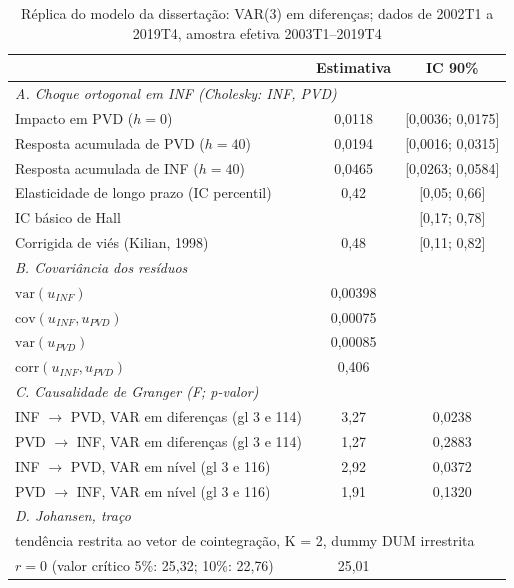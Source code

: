 \begin{table}[htbp]
\centering
\caption{R\'eplica do modelo da disserta\c{c}\~ao: VAR(3) em diferen\c{c}as; dados de 2002T1 a 2019T4, amostra efetiva 2003T1--2019T4}
\label{tab:a1_baseline}
\small
\begin{tabular}{lcc}
\toprule
 & Estimativa & IC 90\% \\
\midrule
\multicolumn{3}{l}{\textit{A. Choque ortogonal em INF (Cholesky: INF, PVD)}} \\
Impacto em PVD ($h = 0$) & 0{,}0118 & [0{,}0036; 0{,}0175] \\
Resposta acumulada de PVD ($h = 40$) & 0{,}0194 & [0{,}0016; 0{,}0315] \\
Resposta acumulada de INF ($h = 40$) & 0{,}0465 & [0{,}0263; 0{,}0584] \\
Elasticidade de longo prazo (IC percentil) & 0{,}42 & [0{,}05; 0{,}66] \\
\quad IC b\'asico de Hall & & [0{,}17; 0{,}78] \\
\quad Corrigida de vi\'es (Kilian, 1998) & 0{,}48 & [0{,}11; 0{,}82] \\
\midrule
\multicolumn{3}{l}{\textit{B. Covari\^ancia dos res\'iduos}} \\
$\mathrm{var}(u_{INF})$ & 0{,}00398 & \\
$\mathrm{cov}(u_{INF}, u_{PVD})$ & 0{,}00075 & \\
$\mathrm{var}(u_{PVD})$ & 0{,}00085 & \\
$\mathrm{corr}(u_{INF}, u_{PVD})$ & 0{,}406 & \\
\midrule
\multicolumn{3}{l}{\textit{C. Causalidade de Granger (F; p-valor)}} \\
INF $\rightarrow$ PVD, VAR em diferen\c{c}as (gl 3 e 114) & 3{,}27 & 0{,}0238 \\
PVD $\rightarrow$ INF, VAR em diferen\c{c}as (gl 3 e 114) & 1{,}27 & 0{,}2883 \\
INF $\rightarrow$ PVD, VAR em n\'ivel (gl 3 e 116) & 2{,}92 & 0{,}0372 \\
PVD $\rightarrow$ INF, VAR em n\'ivel (gl 3 e 116) & 1{,}91 & 0{,}1320 \\
\midrule
\multicolumn{3}{l}{\textit{D. Johansen, tra\c{c}o}} \\
\multicolumn{3}{l}{\quad \footnotesize tend\^encia restrita ao vetor de cointegra\c{c}\~ao, K = 2, dummy DUM irrestrita} \\
$r = 0$ (valor cr\'itico 5\%: 25{,}32; 10\%: 22{,}76) & 25{,}01 & \\

\end{tabular}
\end{table}
